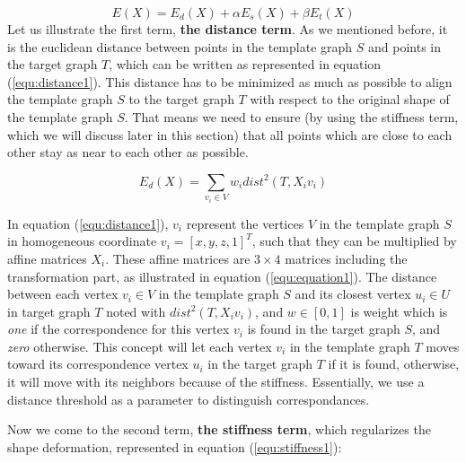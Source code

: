 \documentclass[../structure.tex]{subfiles}
\begin{document}
\begin{equation}
E(X) = E_{d}(X) + \alpha E_{s}(X) + \beta E_{t}(X)
\label{equ:costFun}
\end{equation}
Let us illustrate the first term, \textbf{the distance term}. As we mentioned before, it is the euclidean distance between points in the template graph $S$ and points in the target graph $T$, which can be written as represented in equation (\ref{equ:distance1}). This distance has to be minimized as much as possible to align the template graph $S$ to the target graph $T$ with respect to the original shape of the template graph $S$. That means we need to ensure (by using the stiffness term, which we will discuss later in this section) that all points which are close to each other stay as near to each other as possible.

\begin{equation}
E_{d}(X) = \sum_{v_{i} \in V} w_{i}dist^2(T,X_{i}v_{i})
\label{equ:distance1}
\end{equation}

In equation (\ref{equ:distance1}), $v_{i}$ represent the vertices $V$ in the template graph $S$ in homogeneous coordinate $v_{i} = [x,y,z,1]^T$,  such that they can be multiplied by  affine matrices $X_{i}$. These affine matrices are $3 \times 4$ matrices including the transformation part, as illustrated in equation (\ref{equ:equation1}). The distance between each vertex $v_{i} \in V$ in the template graph $S$ and its closest vertex $u_{i} \in U$ in target graph $T$ noted with $dist^2(T,X_{i}v_{i})$, and $w \in [0,1]$ is weight which is \textit{one} if the correspondence for this vertex $v_{i}$ is found in the target graph $S$, and \textit{zero} otherwise. This concept will let each vertex $v_{i}$ in the template graph $T$ moves toward its correspondence vertex $u_{i}$ in the target graph $T$ if it is found, otherwise, it will move with its neighbors because of the stiffness. Essentially, we use a distance threshold as a parameter to distinguish correspondances.

Now we come to the second term, \textbf{the stiffness term}, which regularizes the shape deformation, represented in equation (\ref{equ:stiffness1}):
\end{document}
